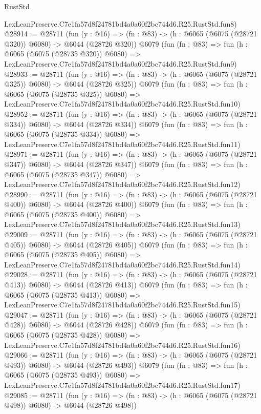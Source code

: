 \begin{lexlean}{RustStd}
\begin{coremodule}
    LexLeanPreserve.C7e1fa57d8f24781bd4a0a60f2bc744d6.R25.RustStd.fun8)
@28914 := @28711
    (fun (y : @16) => (fn : @83) -> (h : @6065 (@6075 (@28721 @320)) @6080) -> @6044 (@28726 @320))
    @6079
    (fun (fn : @83) =>
    fun (h : @6065 (@6075 (@28735 @320)) @6080) =>
    LexLeanPreserve.C7e1fa57d8f24781bd4a0a60f2bc744d6.R25.RustStd.fun9)
@28933 := @28711
    (fun (y : @16) => (fn : @83) -> (h : @6065 (@6075 (@28721 @325)) @6080) -> @6044 (@28726 @325))
    @6079
    (fun (fn : @83) =>
    fun (h : @6065 (@6075 (@28735 @325)) @6080) =>
    LexLeanPreserve.C7e1fa57d8f24781bd4a0a60f2bc744d6.R25.RustStd.fun10)
@28952 := @28711
    (fun (y : @16) => (fn : @83) -> (h : @6065 (@6075 (@28721 @334)) @6080) -> @6044 (@28726 @334))
    @6079
    (fun (fn : @83) =>
    fun (h : @6065 (@6075 (@28735 @334)) @6080) =>
    LexLeanPreserve.C7e1fa57d8f24781bd4a0a60f2bc744d6.R25.RustStd.fun11)
@28971 := @28711
    (fun (y : @16) => (fn : @83) -> (h : @6065 (@6075 (@28721 @347)) @6080) -> @6044 (@28726 @347))
    @6079
    (fun (fn : @83) =>
    fun (h : @6065 (@6075 (@28735 @347)) @6080) =>
    LexLeanPreserve.C7e1fa57d8f24781bd4a0a60f2bc744d6.R25.RustStd.fun12)
@28990 := @28711
    (fun (y : @16) => (fn : @83) -> (h : @6065 (@6075 (@28721 @400)) @6080) -> @6044 (@28726 @400))
    @6079
    (fun (fn : @83) =>
    fun (h : @6065 (@6075 (@28735 @400)) @6080) =>
    LexLeanPreserve.C7e1fa57d8f24781bd4a0a60f2bc744d6.R25.RustStd.fun13)
@29009 := @28711
    (fun (y : @16) => (fn : @83) -> (h : @6065 (@6075 (@28721 @405)) @6080) -> @6044 (@28726 @405))
    @6079
    (fun (fn : @83) =>
    fun (h : @6065 (@6075 (@28735 @405)) @6080) =>
    LexLeanPreserve.C7e1fa57d8f24781bd4a0a60f2bc744d6.R25.RustStd.fun14)
@29028 := @28711
    (fun (y : @16) => (fn : @83) -> (h : @6065 (@6075 (@28721 @413)) @6080) -> @6044 (@28726 @413))
    @6079
    (fun (fn : @83) =>
    fun (h : @6065 (@6075 (@28735 @413)) @6080) =>
    LexLeanPreserve.C7e1fa57d8f24781bd4a0a60f2bc744d6.R25.RustStd.fun15)
@29047 := @28711
    (fun (y : @16) => (fn : @83) -> (h : @6065 (@6075 (@28721 @428)) @6080) -> @6044 (@28726 @428))
    @6079
    (fun (fn : @83) =>
    fun (h : @6065 (@6075 (@28735 @428)) @6080) =>
    LexLeanPreserve.C7e1fa57d8f24781bd4a0a60f2bc744d6.R25.RustStd.fun16)
@29066 := @28711
    (fun (y : @16) => (fn : @83) -> (h : @6065 (@6075 (@28721 @493)) @6080) -> @6044 (@28726 @493))
    @6079
    (fun (fn : @83) =>
    fun (h : @6065 (@6075 (@28735 @493)) @6080) =>
    LexLeanPreserve.C7e1fa57d8f24781bd4a0a60f2bc744d6.R25.RustStd.fun17)
@29085 := @28711
    (fun (y : @16) => (fn : @83) -> (h : @6065 (@6075 (@28721 @498)) @6080) -> @6044 (@28726 @498))

\end{coremodule}
\end{lexlean}
